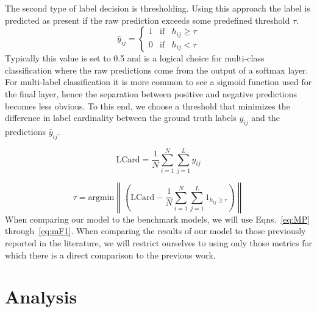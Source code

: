 \documentclass[12pt,journal,compsoc]{IEEEtran}
\begin{document}
The second type of label decision is thresholding. Using this approach the label is predicted as present if the raw prediction exceeds some predefined threshold $\tau$. 
\begin{equation}
\hat{y}_{ij} = \left\{
    \begin{array}{lll}
        1 & \mathrm{if} & h_{ij} \geq \tau \\
        0 & \mathrm{if} & h_{ij} < \tau
    \end{array}
\right.
\end{equation}
Typically this value is set to 0.5 and is a logical choice for multi-class classification where the raw predictions come from the output of a softmax layer.  For multi-label classification it is more common to see a sigmoid function used for the final layer, hence the separation between positive and negative predictions becomes less obvious. To this end, we choose a threshold that minimizes the difference in label cardinality between the ground truth labels $y_{ij}$ and the predictions $\hat{y}_{ij}$.~\cite{Read:2011}

\begin{equation}
\mathrm{LCard} = \frac{1}{N}\sum_{i=1}^{N}\sum_{j=1}^{L}y_{ij}
\label{eq:lcard}
\end{equation}

\begin{equation}
\tau = \mathrm{argmin}\left\|\left(\mathrm{LCard}-\frac{1}{N}\sum_{i=1}^{N}\sum_{j=1}^{L}1_{h_{ij} \geq \tau}\right)\right\|
\label{eq:tau}
\end{equation}
When comparing our model to the benchmark models, we will use Eqns.~\ref{eq:MP} through~\ref{eq:mF1}. When comparing the results of our model to those previously reported in the literature, we will restrict ourselves to using only those metrics for which there is a direct comparison to the previous work.


\section{Analysis} %
\end{document}
